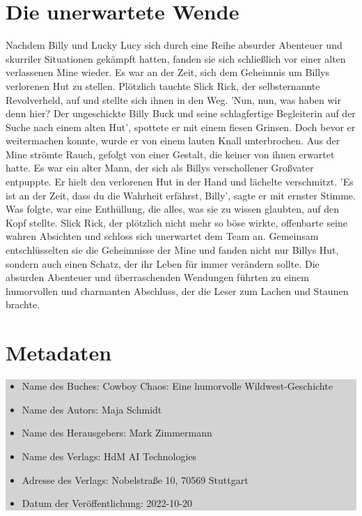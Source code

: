 \documentclass[12pt]{article} %
\begin{document}
\section{ Die unerwartete Wende }
\begin{minipage}{\textwidth}
    Nachdem Billy und Lucky Lucy sich durch eine Reihe absurder Abenteuer und skurriler Situationen gekämpft hatten, fanden sie sich schließlich vor einer alten verlassenen Mine wieder. Es war an der Zeit, sich dem Geheimnis um Billys verlorenen Hut zu stellen. Plötzlich tauchte Slick Rick, der selbsternannte Revolverheld, auf und stellte sich ihnen in den Weg. 'Nun, nun, was haben wir denn hier? Der ungeschickte Billy Buck und seine schlagfertige Begleiterin auf der Suche nach einem alten Hut', spottete er mit einem fiesen Grinsen. Doch bevor er weitermachen konnte, wurde er von einem lauten Knall unterbrochen. Aus der Mine strömte Rauch, gefolgt von einer Gestalt, die keiner von ihnen erwartet hatte. Es war ein alter Mann, der sich als Billys verschollener Großvater entpuppte. Er hielt den verlorenen Hut in der Hand und lächelte verschmitzt. 'Es ist an der Zeit, dass du die Wahrheit erfährst, Billy', sagte er mit ernster Stimme. Was folgte, war eine Enthüllung, die alles, was sie zu wissen glaubten, auf den Kopf stellte. Slick Rick, der plötzlich nicht mehr so böse wirkte, offenbarte seine wahren Absichten und schloss sich unerwartet dem Team an. Gemeinsam entschlüsselten sie die Geheimnisse der Mine und fanden nicht nur Billys Hut, sondern auch einen Schatz, der ihr Leben für immer verändern sollte. Die absurden Abenteuer und überraschenden Wendungen führten zu einem humorvollen und charmanten Abschluss, der die Leser zum Lachen und Staunen brachte.
\end{minipage}

\clearpage
\section*{Metadaten}
\begin{minipage}{\textwidth}
    \colorbox{lightgray}{
        \begin{minipage}{\dimexpr\textwidth-2\fboxsep}
            \vspace{4cm}
            \begin{itemize}
                \item Name des Buches: Cowboy Chaos: Eine humorvolle Wildwest-Geschichte
                \item Name des Autors: Maja Schmidt
                \item Name des Herausgebers: Mark Zimmermann
                \item Name des Verlags: HdM AI Technologies
                \item Adresse des Verlags: Nobelstraße 10, 70569 Stuttgart
                \item Datum der Veröffentlichung: 2022-10-20
            \end{itemize}
            \vspace{4cm}
        \end{minipage}

    }
\end{minipage}
\end{document}
